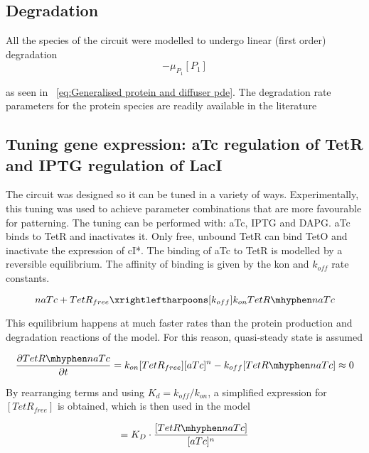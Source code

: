 \subsection{Degradation}
All the species of the circuit were modelled to undergo linear (first order) degradation
\begin{equation}
    -\mu_{P_{1}}[P_{1}]
\end{equation}

as seen in ~\eqref{eq:Generalised protein and diffuser pde}.
The degradation rate parameters for the protein species are readily available in the literature

\subsection{Tuning gene expression: aTc regulation of TetR and IPTG regulation of LacI }
The circuit was designed so it can be tuned in a variety of ways.
Experimentally, this tuning was used to achieve parameter combinations that are more favourable for patterning.
The tuning can be performed with: aTc, IPTG and DAPG.
aTc binds to TetR and inactivates it.
Only free, unbound TetR can bind TetO and inactivate the expression of cI*.
The binding of aTc to TetR is modelled by a reversible equilibrium.
The affinity of binding is given by the kon and $k_{off}$ rate constants.


\begin{equation}
    naTc + TetR_{free} \xrightleftharpoons[k_{off}]{k_{on}} TetR \mhyphen naTc
\end{equation}

This equilibrium happens at much faster rates than the protein production and degradation reactions of the model.
For this reason, quasi-steady state is assumed

\begin{equation}
    \pdv{TetR \mhyphen naTc}{t} = k_{on}[TetR_{free}][aTc]^n - k_{off}[TetR \mhyphen naTc] \approx 0
\end{equation}

By rearranging terms and using $K_{d} = k_{off}/k_{on}$, a simplified expression for $[TetR_{free}]$ is obtained, which is then used in the model

\begin{equation}
[TetR_{free}] = K_{D}\cdot \frac{[TetR \mhyphen naTc]}{[aTc]^n}
\end{equation}

